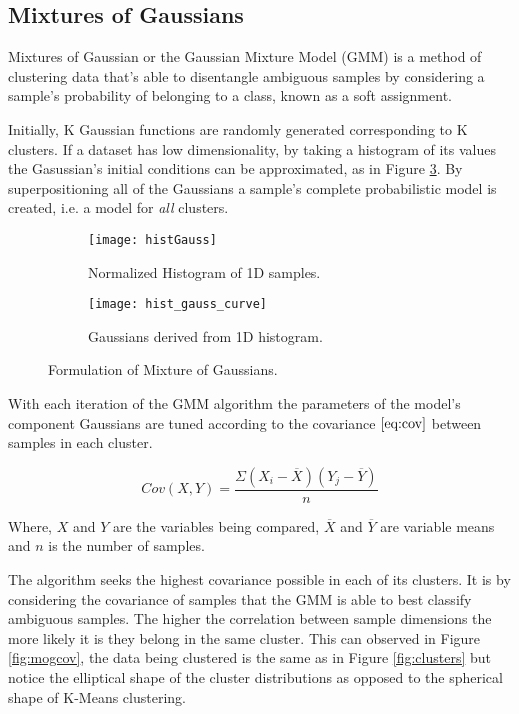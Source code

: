  \subsection{Mixtures of Gaussians}

Mixtures of Gaussian or the Gaussian Mixture Model (GMM) is a method of clustering data that's able to disentangle ambiguous samples by considering a sample's probability of belonging to a class, known as a soft assignment. 

Initially, K Gaussian functions are randomly generated corresponding to K clusters. If a dataset has low dimensionality, by taking a histogram of its values the Gasussian's initial conditions can be approximated, as in Figure \ref{fig:mixture}. By superpositioning all of the Gaussians a sample's complete probabilistic model is created, i.e. a model for \emph{all} clusters. 

\begin{figure}[H]
	\centering
	\begin{subfigure}[b]{0.5\linewidth}
            \centering\texttt{[image: histGauss]}
      		\caption{Normalized Histogram of 1D samples.}
		\label{fig:histGauss}
    	\end{subfigure}%
    	\begin{subfigure}[b]{0.5\linewidth}
      		\centering\texttt{[image: hist\_gauss\_curve]}
      		\caption{Gaussians derived from 1D histogram. }
       		\label{fig:histCurve}
		\end{subfigure}
		\caption{Formulation of Mixture of Gaussians.}
    	\label{fig:mixture}
\end{figure}

With each iteration of the GMM algorithm the parameters of the model's component Gaussians are tuned according to the covariance $\ref{eq:cov}$ between samples in each cluster. 

\begin{equation}
Cov(X, Y) = \frac{\Sigma(X_i-\overline X)(Y_j-\overline Y)}{n}
\label{eq:cov}
\end{equation}

Where, $X$ and $Y$ are the variables being compared, $\overline X$ and $\overline Y$ are variable means and $n$ is the number of samples.

The algorithm seeks the highest covariance possible in each of its clusters. It is by considering the covariance of samples that the GMM is able to best classify ambiguous samples. The higher the correlation between sample dimensions the more likely it is they belong in the same cluster. This can observed in Figure \ref{fig:mogcov}, the data being clustered is the same as in Figure \ref{fig:clusters} but notice the elliptical shape of the cluster distributions as opposed to the spherical shape of K-Means clustering.

